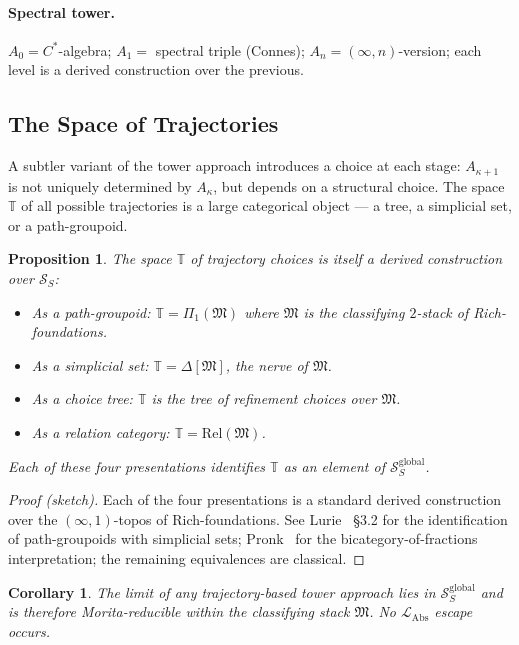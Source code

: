\documentclass[11pt]{article}
\theoremstyle{plain}
\newtheorem{proposition}[theorem]{Proposition}
\newtheorem{corollary}[theorem]{Corollary}
\theoremstyle{definition}
\newcommand{\cS}{\mathcal{S}}
\newcommand{\fM}{\mathfrak{M}}
\newcommand{\LAbs}{\mathcal{L}_{\mathrm{Abs}}}
\begin{document}
\paragraph{Spectral tower.} $A_0 = C^*$-algebra; $A_1 = $ spectral triple (Connes); $A_n = (\infty, n)$-version; each level is a derived construction over the previous.

\subsection{The Space of Trajectories}

A subtler variant of the tower approach introduces a choice at each stage: $A_{\kappa+1}$ is not uniquely determined by $A_\kappa$, but depends on a structural choice. The space $\mathbb{T}$ of all possible trajectories is a large categorical object --- a tree, a simplicial set, or a path-groupoid.

\begin{proposition}\label{prop:trajectory-space}
The space $\mathbb{T}$ of trajectory choices is itself a derived construction over $\cS_S$:
\begin{itemize}
\item As a path-groupoid: $\mathbb{T} = \Pi_1(\fM)$ where $\fM$ is the classifying $2$-stack of Rich-foundations.
\item As a simplicial set: $\mathbb{T} = \Delta[\fM]$, the nerve of $\fM$.
\item As a choice tree: $\mathbb{T}$ is the tree of refinement choices over $\fM$.
\item As a relation category: $\mathbb{T} = \mathrm{Rel}(\fM)$.
\end{itemize}
Each of these four presentations identifies $\mathbb{T}$ as an element of $\cS_S^{\mathrm{global}}$.
\end{proposition}

\begin{proof}[Proof (sketch)]
Each of the four presentations is a standard derived construction over the $(\infty, 1)$-topos of Rich-foundations. See Lurie~\cite{LurieHTT} \S 3.2 for the identification of path-groupoids with simplicial sets; Pronk~\cite{Pronk1996} for the bicategory-of-fractions interpretation; the remaining equivalences are classical.
\end{proof}

\begin{corollary}
The limit of any trajectory-based tower approach lies in $\cS_S^{\mathrm{global}}$ and is therefore Morita-reducible within the classifying stack $\fM$. No $\LAbs$ escape occurs.
\end{corollary}
\end{document}
